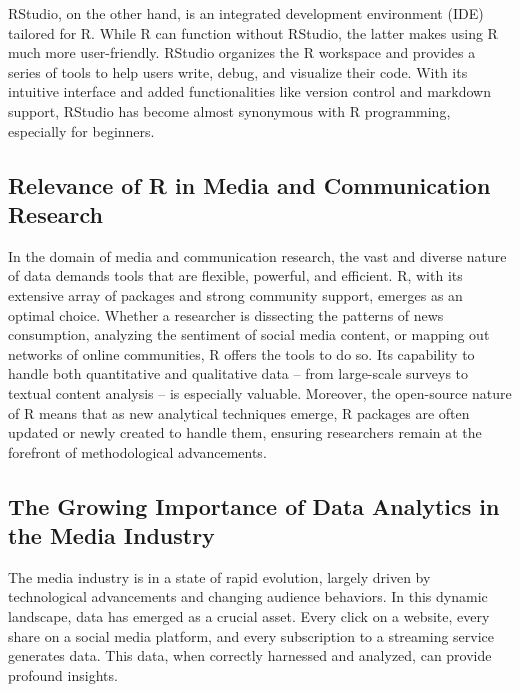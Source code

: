 \documentclass[
  b5paper]{book}
\begin{document}
RStudio, on the other hand, is an integrated development environment (IDE) tailored for R. While R can function without RStudio, the latter makes using R much more user-friendly. RStudio organizes the R workspace and provides a series of tools to help users write, debug, and visualize their code. With its intuitive interface and added functionalities like version control and markdown support, RStudio has become almost synonymous with R programming, especially for beginners.

\hypertarget{relevance-of-r-in-media-and-communication-research}{%
\subsection*{Relevance of R in Media and Communication Research}\label{relevance-of-r-in-media-and-communication-research}}

In the domain of media and communication research, the vast and diverse nature of data demands tools that are flexible, powerful, and efficient. R, with its extensive array of packages and strong community support, emerges as an optimal choice. Whether a researcher is dissecting the patterns of news consumption, analyzing the sentiment of social media content, or mapping out networks of online communities, R offers the tools to do so. Its capability to handle both quantitative and qualitative data -- from large-scale surveys to textual content analysis -- is especially valuable. Moreover, the open-source nature of R means that as new analytical techniques emerge, R packages are often updated or newly created to handle them, ensuring researchers remain at the forefront of methodological advancements.

\hypertarget{the-growing-importance-of-data-analytics-in-the-media-industry}{%
\subsection*{The Growing Importance of Data Analytics in the Media Industry}\label{the-growing-importance-of-data-analytics-in-the-media-industry}}

The media industry is in a state of rapid evolution, largely driven by technological advancements and changing audience behaviors. In this dynamic landscape, data has emerged as a crucial asset. Every click on a website, every share on a social media platform, and every subscription to a streaming service generates data. This data, when correctly harnessed and analyzed, can provide profound insights.
\end{document}
